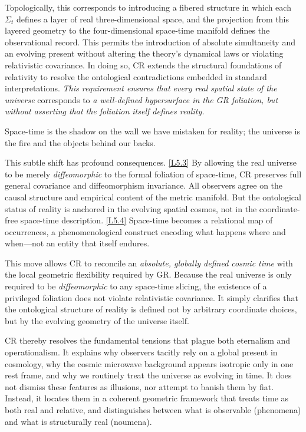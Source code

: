 \documentclass[12pt]{book}
\newcounter{logicanchor}
\newenvironment{logicanchorenv}[1]{\refstepcounter{logicanchor}\label{#1}}{}
\newcommand{\logiclink}[2]{\begin{logicanchorenv}{logic:#1}\end{logicanchorenv}\hyperref[appendix:#1]{[#1]}\xspace}
\begin{document}
Topologically, this corresponds to introducing a fibered structure in which each $\Sigma_t$ defines a layer of real three-dimensional space, and the projection from this layered geometry to the four-dimensional space-time manifold defines the observational record. This permits the introduction of absolute simultaneity and an evolving present without altering the theory's dynamical laws or violating relativistic covariance. In doing so, CR extends the structural foundations of relativity to resolve the ontological contradictions embedded in standard interpretations. \textit{This requirement ensures that every real spatial state of the universe} corresponds to \textit{a well-defined hypersurface in the GR foliation, but without asserting that the foliation itself defines reality.} 

Space-time is the shadow on the wall we have mistaken for reality; the universe is the fire and the objects behind our backs.

This subtle shift has profound consequences. \logiclink{L5.3}{} By allowing the real universe to be merely \textit{diffeomorphic} to the formal foliation of space-time, CR preserves full general covariance and diffeomorphism invariance. All observers agree on the causal structure and empirical content of the metric manifold. But the ontological status of reality is anchored in the evolving spatial cosmos, not in the coordinate-free space-time description. \logiclink{L5.4}{} Space-time becomes a relational map of occurrences, a phenomenological construct encoding what happens where and when---not an entity that itself endures.

This move allows CR to reconcile an \textit{absolute, globally defined cosmic time} with the local geometric flexibility required by GR. Because the real universe is only required to be \textit{diffeomorphic} to any space-time slicing, the existence of a privileged foliation does not violate relativistic covariance. It simply clarifies that the ontological structure of reality is defined not by arbitrary coordinate choices, but by the evolving geometry of the universe itself.

CR thereby resolves the fundamental tensions that plague both eternalism and operationalism. It explains why observers tacitly rely on a global present in cosmology, why the cosmic microwave background appears isotropic only in one rest frame, and why we routinely treat the universe as evolving in time. It does not dismiss these features as illusions, nor attempt to banish them by fiat. Instead, it locates them in a coherent geometric framework that treats time as both real and relative, and distinguishes between what is observable (phenomena) and what is structurally real (noumena).
\end{document}
